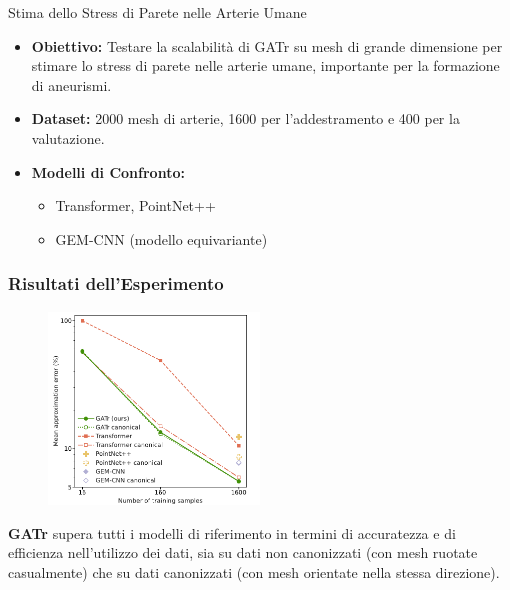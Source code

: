 \begin{frame}{Stima dello Stress di Parete nelle Arterie Umane}
    \begin{itemize}
        \item \textbf{Obiettivo:} Testare la scalabilità di GATr su mesh di grande 
        dimensione per stimare lo stress di parete nelle arterie umane, importante per 
        la formazione di aneurismi.
        \item \textbf{Dataset:} 2000 mesh di arterie, 1600 per l'addestramento e 400 
        per la valutazione.
        \item \textbf{Modelli di Confronto:}
        \begin{itemize}
            \item Transformer, PointNet++
            \item GEM-CNN (modello equivariante)
        \end{itemize}
    \end{itemize}
\end{frame}
    
\begin{frame}
    \frametitle{Risultati dell'Esperimento}
    \begin{figure}
        \centering
        \includegraphics[width=0.5\textwidth]{../Images/arteries.png}
    \end{figure}
    
        \textbf{GATr} supera tutti i modelli di riferimento in termini di accuratezza e 
        di efficienza nell'utilizzo dei dati, sia su dati non canonizzati 
        (con mesh ruotate casualmente) che su dati canonizzati 
        (con mesh orientate nella stessa direzione).
\end{frame}

